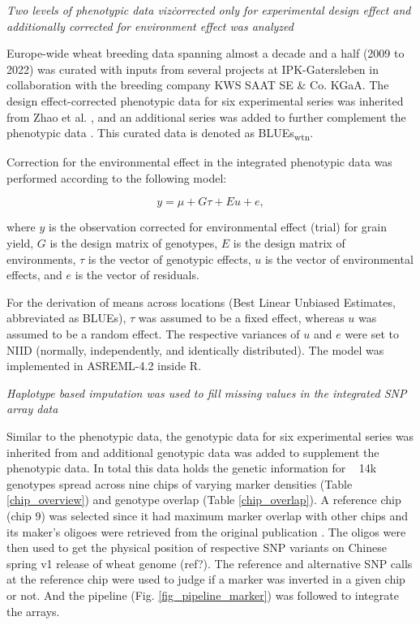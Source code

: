\documentclass[english, biblatex]{lni}
\begin{document}
\textit{Two levels of phenotypic data viz\. corrected only for experimental design effect and additionally corrected for environment effect was analyzed}

Europe-wide wheat breeding data spanning almost a decade and a half (2009 to 2022) was curated with inputs from several projects at IPK-Gatersleben in collaboration with the breeding company KWS SAAT SE \& Co. KGaA. The design effect-corrected phenotypic data for six experimental series was inherited from Zhao et al. \cite{zhao2021unlocking}, and an additional series was added to further complement the phenotypic data \cite{gogna_gabi_2022}. This curated data is denoted as BLUEs\textsubscript{wtn}.

Correction for the environmental effect in the integrated phenotypic data was performed according to the following model:

\vspace{6pt}

\hspace{0.5cm}\begin{minipage}{\dimexpr\linewidth-0.5cm}
\begin{equation}
y = \mu + G\tau + Eu + e,
\end{equation}
\end{minipage}

\vspace{6pt}

where \(y\) is the observation corrected for environmental effect (trial) for grain yield, \(G\) is the design matrix of genotypes, \(E\) is the design matrix of environments, \(\tau\) is the vector of genotypic effects, \(u\) is the vector of environmental effects, and \(e\) is the vector of residuals.

For the derivation of means across locations (Best Linear Unbiased Estimates, abbreviated as BLUEs), \(\tau\) was assumed to be a fixed effect, whereas \(u\) was assumed to be a random effect. The respective variances of \(u\) and \(e\) were set to NIID (normally, independently, and identically distributed). The model was implemented in ASREML-4.2 inside R.

\textit{Haplotype based imputation was used to fill missing values in the integrated SNP array data}

Similar to the phenotypic data, the genotypic data for six experimental series was inherited from \cite{zhao2021unlocking} and additional genotypic data was added to supplement the phenotypic data. In total this data holds the genetic information for ~ 14k genotypes spread across nine chips of varying marker densities (Table \ref {chip_overview}) and genotype overlap (Table \ref {chip_overlap}). A reference chip (chip 9) was selected since it had maximum marker overlap with other chips and its maker's oligoes were retrieved from the original publication \cite{wang2014characterization}. The oligos were then used to get the physical position of respective SNP variants on Chinese spring v1 release of wheat genome (ref?). The reference and alternative SNP calls at the reference chip were used to judge if a marker was inverted in a given chip or not. And the pipeline  (Fig. \ref{fig_pipeline_marker}) was followed to integrate the arrays.
\end{document}
